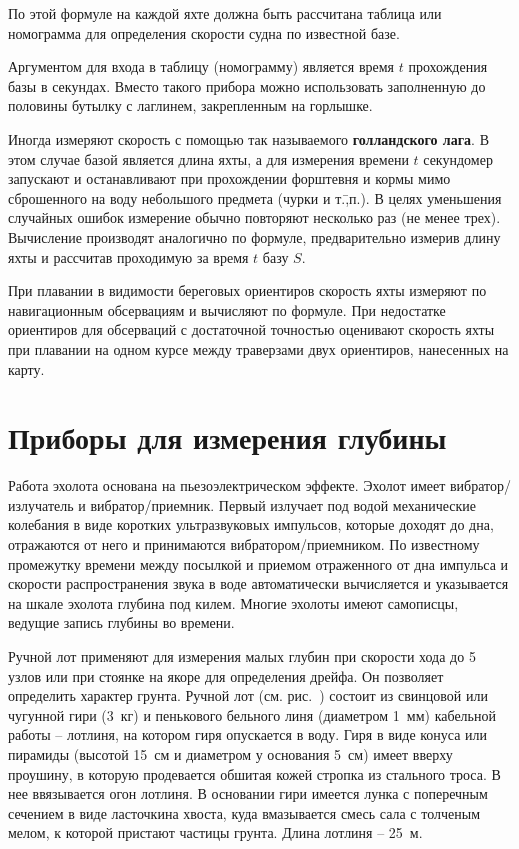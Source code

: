 По этой формуле на каждой яхте должна быть рассчитана таблица или номограмма для определения скорости судна по известной базе. 

Аргументом для входа в таблицу (номограмму) является время $t$ прохождения базы в секундах. Вместо такого прибора можно использовать заполненную до половины бутылку с лаглинем, закрепленным на горлышке. 

Иногда измеряют скорость с помощью так называемого \textbf{голландского лага}. В этом случае базой является длина яхты, а для измерения времени $t$ секундомер запускают и останавливают при прохождении форштевня и кормы мимо сброшенного на воду небольшого предмета (чурки и т.\=,п.). В целях уменьшения случайных ошибок измерение обычно повторяют несколько раз (не менее трех). Вычисление производят аналогично по формуле, предварительно измерив длину яхты и рассчитав проходимую за время $t$ базу $S$. 

При плавании в видимости береговых ориентиров скорость яхты измеряют по навигационным обсервациям и вычисляют по формуле. При недостатке ориентиров для обсерваций с достаточной точностью оценивают скорость яхты при плавании на одном курсе между траверзами двух ориентиров, нанесенных на карту. 

\section{Приборы для измерения глубины}

Работа эхолота основана на пьезоэлектрическом эффекте. Эхолот имеет вибратор\-/излучатель и вибратор\-/приемник. Первый излучает под водой механические колебания в виде коротких ультразвуковых импульсов, которые доходят до дна, отражаются от него и принимаются вибратором\-/приемником. По известному промежутку времени между посылкой и приемом отраженного от дна импульса и скорости распространения звука в воде автоматически вычисляется и указывается на шкале эхолота глубина под килем. Многие эхолоты имеют самописцы, ведущие запись глубины во времени. 

Ручной лот применяют для измерения малых глубин при скорости хода до 5 узлов или при стоянке на якоре для определения дрейфа. Он позволяет определить характер грунта. Ручной лот (см. рис.~) состоит из свинцовой или чугунной гири (3~кг) и пенькового бельного линя (диаметром 1~мм) кабельной работы \--- лотлиня, на котором гиря опускается в воду. Гиря в виде конуса или пирамиды (высотой 15~см и диаметром у основания 5~см) имеет вверху проушину, в которую продевается обшитая кожей стропка из стального троса. В нее ввязывается огон лотлиня. В основании гири имеется лунка с поперечным сечением в виде ласточкина хвоста, куда вмазывается смесь сала с толченым мелом, к которой пристают частицы грунта. Длина лотлиня \--- 25~м. 

